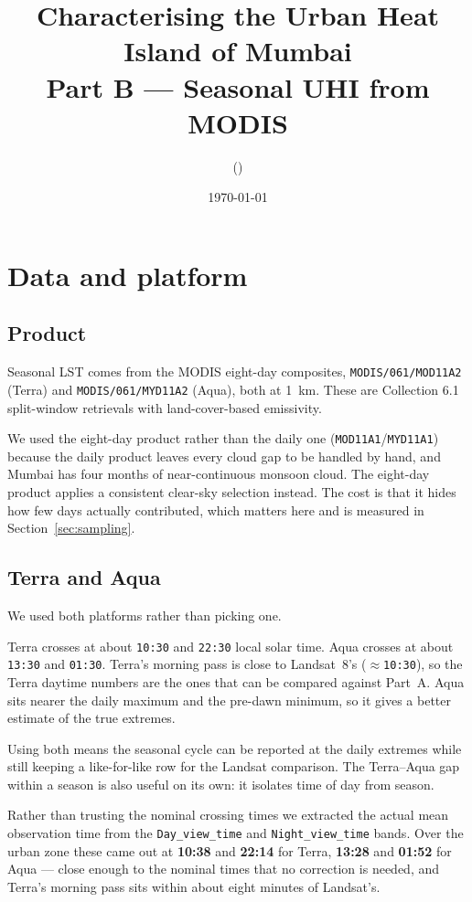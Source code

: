 \documentclass[11pt,a4paper]{article}
\title{Characterising the Urban Heat Island of Mumbai\\
       \large Part B — Seasonal UHI from MODIS}
\author{\TODO{Name} (\TODO{Roll No.})}
\date{\today}
\begin{document}
\maketitle

\section{Data and platform}

\subsection{Product}

Seasonal LST comes from the MODIS eight-day composites,
\texttt{MODIS/061/MOD11A2} (Terra) and \texttt{MODIS/061/MYD11A2}
(Aqua), both at \SI{1}{\kilo\metre}. These are Collection 6.1
split-window retrievals with land-cover-based emissivity.

We used the eight-day product rather than the daily one
(\texttt{MOD11A1}/\texttt{MYD11A1}) because the daily product leaves
every cloud gap to be handled by hand, and Mumbai has four months of
near-continuous monsoon cloud. The eight-day product applies a
consistent clear-sky selection instead. The cost is that it hides how
few days actually contributed, which matters here and is measured in
Section~\ref{sec:sampling}.

\subsection{Terra and Aqua}

We used both platforms rather than picking one.

Terra crosses at about \texttt{10:30} and \texttt{22:30} local solar
time. Aqua crosses at about \texttt{13:30} and \texttt{01:30}. Terra's
morning pass is close to Landsat~8's (\(\approx\)\texttt{10:30}), so
the Terra daytime numbers are the ones that can be compared against
Part~A. Aqua sits nearer the daily maximum and the pre-dawn minimum,
so it gives a better estimate of the true extremes.

Using both means the seasonal cycle can be reported at the daily
extremes while still keeping a like-for-like row for the Landsat
comparison. The Terra--Aqua gap within a season is also useful on its
own: it isolates time of day from season.

Rather than trusting the nominal crossing times we extracted the
actual mean observation time from the \texttt{Day\_view\_time} and
\texttt{Night\_view\_time} bands. Over the urban zone these came out
at \textbf{10:38} and \textbf{22:14} for Terra, \textbf{13:28} and
\textbf{01:52} for Aqua --- close enough to the nominal times that no
correction is needed, and Terra's morning pass sits within about eight
minutes of Landsat's.
\end{document}
